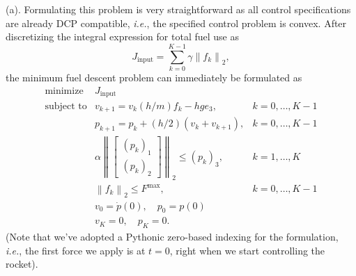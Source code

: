 \documentclass[12pt,reqno]{article}
\theoremstyle{definition}
\numberwithin{equation}{section}
\begin{document}
    \noindent (a). Formulating this problem is very straightforward as all
    control specifications are already DCP compatible, \textit{i.e.}, the specified control
    problem is convex. After discretizing the integral expression for total fuel use as
    \[J_{\mathrm{input}} = \sum_{k=0}^{K-1}\gamma \left\lVert f_k \right\rVert_{2},\]
    the minimum fuel descent problem can immediately be formulated as
    \[\begin{array}{lll}
    \text{minimize} \; & J_{\mathrm{input}} & \\
    \text{subject to} & v_{k+1} = v_k (h/m)f_k - hge_3, & k = 0, \ldots, K-1 \\
    & p_{k+1} = p_k + (h/2)(v_k + v_{k+1}), & k = 0, \ldots, K-1 \\
    & \alpha \left\lVert \begin{bmatrix} (p_k)_1 \\ (p_k)_2 \end{bmatrix} \right\rVert_{2} \le (p_k)_3, & k=1, \ldots, K \\
    & \left\lVert f_k \right\rVert_{2} \le F^{\mathrm{max}}, & k = 0, \ldots, K-1 \\
    & v_{0} = \dot{p}(0), \quad p_0 = p(0) & \\
    & v_{K} = 0, \quad p_{K} = 0.
    \end{array}\]
    (Note that we've adopted a Pythonic zero-based indexing for the formulation, \textit{i.e.},
    the first force we apply is at $t=0$, right when we start controlling the rocket).
\end{document}
